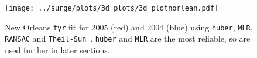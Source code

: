 \begin{figure}
\centering
\texttt{[image: ../surge/plots/3d\_plots/3d\_plotnorlean.pdf]}
 \caption{New Orleans \texttt{tyr} fit for 2005 (red) and 2004 (blue) using
 \texttt{huber}, \texttt{MLR}, \texttt{RANSAC} and \texttt{Theil-Sun}~\cite{scikit-learn}.
 \texttt{huber} and \texttt{MLR} are the most reliable, so are used further in later
 sections.}
 \label{fig:tau-tau-r-no}
\end{figure}
